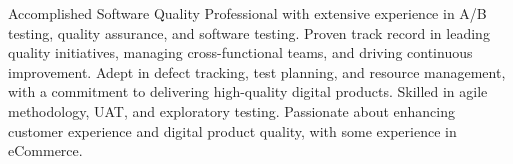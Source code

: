 

\begin{cvparagraph}

Accomplished Software Quality Professional with extensive experience in A/B testing, quality assurance, and software testing. Proven track record in leading quality initiatives, managing cross-functional teams, and driving continuous improvement. Adept in defect tracking, test planning, and resource management, with a commitment to delivering high-quality digital products. Skilled in agile methodology, UAT, and exploratory testing. Passionate about enhancing customer experience and digital product quality, with some experience in eCommerce.
\end{cvparagraph}

